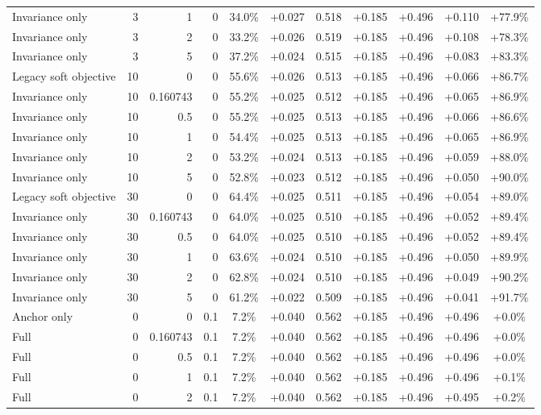 \begin{table}[htbp]
\begin{tabular}{lrrrccccccc}
Invariance only & 3 & 1 & 0 & 34.0\% & +0.027 & 0.518 & +0.185 & +0.496 & +0.110 & +77.9\% \\
Invariance only & 3 & 2 & 0 & 33.2\% & +0.026 & 0.519 & +0.185 & +0.496 & +0.108 & +78.3\% \\
Invariance only & 3 & 5 & 0 & 37.2\% & +0.024 & 0.515 & +0.185 & +0.496 & +0.083 & +83.3\% \\
Legacy soft objective & 10 & 0 & 0 & 55.6\% & +0.026 & 0.513 & +0.185 & +0.496 & +0.066 & +86.7\% \\
Invariance only & 10 & 0.160743 & 0 & 55.2\% & +0.025 & 0.512 & +0.185 & +0.496 & +0.065 & +86.9\% \\
Invariance only & 10 & 0.5 & 0 & 55.2\% & +0.025 & 0.513 & +0.185 & +0.496 & +0.066 & +86.6\% \\
Invariance only & 10 & 1 & 0 & 54.4\% & +0.025 & 0.513 & +0.185 & +0.496 & +0.065 & +86.9\% \\
Invariance only & 10 & 2 & 0 & 53.2\% & +0.024 & 0.513 & +0.185 & +0.496 & +0.059 & +88.0\% \\
Invariance only & 10 & 5 & 0 & 52.8\% & +0.023 & 0.512 & +0.185 & +0.496 & +0.050 & +90.0\% \\
Legacy soft objective & 30 & 0 & 0 & 64.4\% & +0.025 & 0.511 & +0.185 & +0.496 & +0.054 & +89.0\% \\
Invariance only & 30 & 0.160743 & 0 & 64.0\% & +0.025 & 0.510 & +0.185 & +0.496 & +0.052 & +89.4\% \\
Invariance only & 30 & 0.5 & 0 & 64.0\% & +0.025 & 0.510 & +0.185 & +0.496 & +0.052 & +89.4\% \\
Invariance only & 30 & 1 & 0 & 63.6\% & +0.024 & 0.510 & +0.185 & +0.496 & +0.050 & +89.9\% \\
Invariance only & 30 & 2 & 0 & 62.8\% & +0.024 & 0.510 & +0.185 & +0.496 & +0.049 & +90.2\% \\
Invariance only & 30 & 5 & 0 & 61.2\% & +0.022 & 0.509 & +0.185 & +0.496 & +0.041 & +91.7\% \\
Anchor only & 0 & 0 & 0.1 & 7.2\% & +0.040 & 0.562 & +0.185 & +0.496 & +0.496 & +0.0\% \\
Full & 0 & 0.160743 & 0.1 & 7.2\% & +0.040 & 0.562 & +0.185 & +0.496 & +0.496 & +0.0\% \\
Full & 0 & 0.5 & 0.1 & 7.2\% & +0.040 & 0.562 & +0.185 & +0.496 & +0.496 & +0.0\% \\
Full & 0 & 1 & 0.1 & 7.2\% & +0.040 & 0.562 & +0.185 & +0.496 & +0.496 & +0.1\% \\
Full & 0 & 2 & 0.1 & 7.2\% & +0.040 & 0.562 & +0.185 & +0.496 & +0.495 & +0.2\% \\

\end{tabular}
\end{table}
